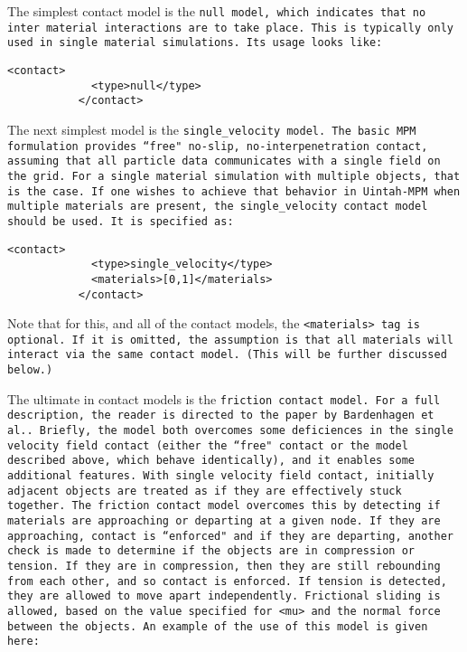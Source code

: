 The simplest contact model is the \tt null \normalfont model, which indicates
that no inter material interactions are to take place.  This is typically only
used in single material simulations.  Its usage looks like:

\begin{Verbatim}[fontsize=\footnotesize]
           <contact>
             <type>null</type>
           </contact>
\end{Verbatim}

The next simplest model is the \tt single\_velocity \normalfont model.
The basic MPM formulation provides ``free" no-slip, no-interpenetration
contact, assuming that all particle data communicates with a single field
on the grid.  For a single material simulation with multiple objects, that
is the case.  If one wishes to achieve that behavior in Uintah-MPM when
multiple materials are present, the \tt single\_velocity \normalfont contact
model should be used.  It is specified as:

\begin{Verbatim}[fontsize=\footnotesize]
           <contact>
             <type>single_velocity</type>
             <materials>[0,1]</materials>
           </contact>
\end{Verbatim}
Note that for this, and all of the contact models,
the \tt <materials> \normalfont tag is optional.  If it is omitted,
the assumption is that all materials will interact via the same contact model.
(This will be further discussed below.)

The ultimate in contact models is the \tt friction \normalfont contact 
model.  For a full description, the reader is directed to the paper by
Bardenhagen et al.\cite{bard_contact}.  Briefly, the model both overcomes
some deficiences in the single velocity field contact (either the ``free"
contact or the model described above, which behave identically), and it
enables some additional features.  With single velocity field contact,
initially adjacent objects are treated as if they are effectively stuck
together.  The friction contact model overcomes this by detecting if
materials are approaching or departing at a given node.  If they are
approaching, contact is ``enforced" and if they are departing, another
check is made to determine if the objects are in compression or tension.
If they are in compression, then they are still rebounding from each other,
and so contact is enforced.  If tension is detected, they are allowed
to move apart independently.  Frictional sliding is allowed, based on
the value specified for \tt <mu> \normalfont and the normal force between
the objects.  An example of the use of this model is given here:

